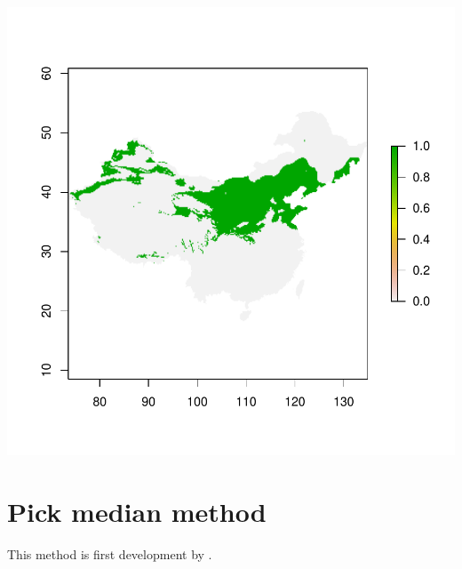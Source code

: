 \documentclass{report}
\begin{document}
\includegraphics{sdmvspecies-pick_mean_method}
\section*{Pick median method}
This method is first development by \citet{lobo_exploring_2011}.
\end{document}
